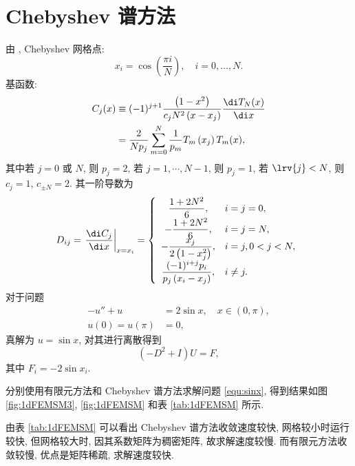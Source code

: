 \documentclass[UTF8, a4paper, 12pt, oneside, onecolumn]{article}
\begin{document}
\section{Chebyshev 谱方法}

由 \cite{Gottlieb1984TheoryAA}, Chebyshev 网格点:
\begin{equation}
	x_i=\cos \left(\frac{\pi i}{N}\right), \quad i=0, \ldots, N.
\end{equation}
基函数:
\begin{subequations}
\begin{align}
	C_j(x) & \equiv(-1)^{j+1} \frac{\left(1-x^2\right)}{c_j N^2\left(x-x_j\right)} \frac{\di T_N(x)}{\di x} \\
	&=\frac{2}{N p_j} \sum_{m=0}^N \frac{1}{p_m} T_m\left(x_j\right) T_m(x),
\end{align}
\end{subequations}
其中若 $j = 0$ 或 $N$, 则 $p_j = 2$, 若 $j = 1, \cdots, N - 1$, 则 $p_j = 1$, 若 $\lrv{j} < N$, 则 $c_j = 1$, $c_{\pm N} = 2$.
其一阶导数为
\begin{equation}
	D_{ij} = \left.\frac{\di C_j}{\di x}\right|_{x=x_i}=\left\{\begin{array}{cl}
	\dfrac{1+2 N^2}{6}, & i=j=0, \\
	-\dfrac{1+2 N^2}{6}, & i=j=N, \\
	-\dfrac{x_j}{2\left(1-x_j^2\right)}, & i=j, 0<j<N, \\
	\dfrac{(-1)^{i+j} p_i}{p_j\left(x_i-x_j\right)}, & i \neq j.
	\end{array}\right.
\end{equation}
对于问题
\begin{subequations}\label{equ:sinx}
	\begin{align}
		-u'' + u &= 2\sin x,\quad x \in (0, \pi),\\
		u(0) = u(\pi) &= 0,
	\end{align}
\end{subequations}
真解为 $u = \sin x$, 对其进行离散得到
\begin{equation*}
	(- D^2 + I) U = F,
\end{equation*}
其中 $F_{i} = -2\sin x_i$.

分别使用有限元方法和 Chebyshev 谱方法求解问题 \eqref{equ:sinx}, 得到结果如图 \ref{fig:1dFEMSM3}, \ref{fig:1dFEMSM} 和表 \ref{tab:1dFEMSM} 所示.

由表 \ref{tab:1dFEMSM} 可以看出 Chebyshev 谱方法收敛速度较快, 网格较小时运行较快, 但网格较大时, 因其系数矩阵为稠密矩阵, 故求解速度较慢. 而有限元方法收敛较慢, 优点是矩阵稀疏, 求解速度较快.
\end{document}
